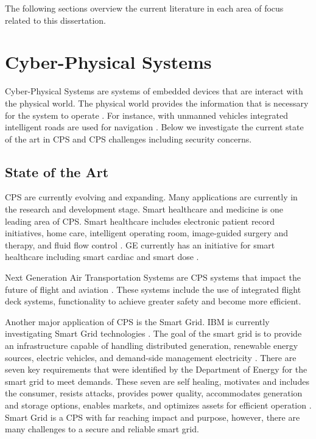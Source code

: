 \documentclass[../main.tex]{subfiles}
\begin{document}
The following sections overview the current literature in each area of focus related to this dissertation. 






\section{Cyber-Physical Systems}

Cyber-Physical Systems are systems of embedded devices that are interact with the physical world. The physical world provides the information that is necessary for the system to operate \cite{banerjee2012ensuring}. For instance, with unmanned vehicles integrated intelligent roads are used for navigation \cite{shi2011survey}. Below we investigate the current state of the art in CPS and CPS challenges including security concerns.

\subsection{State of the Art}
CPS are currently evolving and expanding. Many applications are currently in the research and development stage. Smart healthcare and medicine is one leading area of CPS. Smart healthcare includes electronic patient record initiatives, home care, intelligent operating room, image-guided surgery and therapy, and fluid flow control \cite{baheti2011cyber,shi2011survey, banerjee2012ensuring}. GE currently has an initiative for smart healthcare including smart cardiac and smart dose \cite{ge_health}.

Next Generation Air Transportation Systems are CPS systems that impact the future of flight and aviation \cite{baheti2011cyber}. These systems include the use of integrated flight deck systems, functionality to achieve greater safety and become more efficient. 

Another major application of CPS is the Smart Grid. IBM is currently investigating Smart Grid technologies \cite{ibm_grid}. The goal of the smart grid is to provide an infrastructure capable of handling distributed generation, renewable energy sources, electric vehicles, and demand-side management electricity \cite{6032699}. There are seven key requirements that were identified by the Department of Energy for the smart grid to meet demands. These seven are self healing, motivates and includes the consumer, resists attacks, provides power quality, accommodates generation and storage options, enables markets, and optimizes assets for efficient operation \cite{6032699,DOErequire}. Smart Grid is a CPS with far reaching impact and purpose, however, there are many challenges to a secure and reliable smart grid. 
\end{document}
